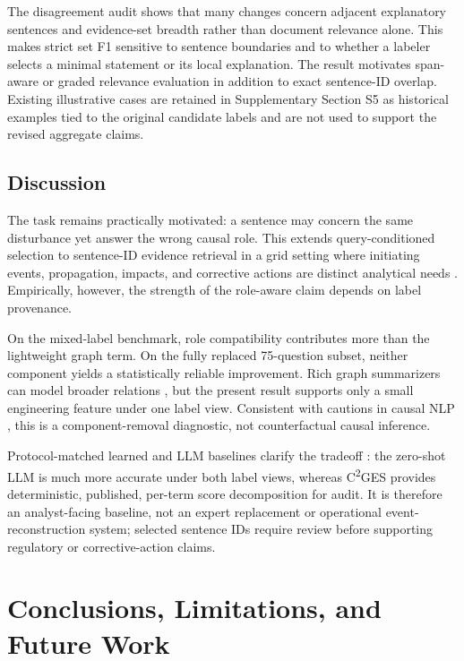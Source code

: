 \documentclass{article}
\begin{document}
The disagreement audit shows that many changes concern adjacent explanatory sentences and evidence-set breadth rather than document relevance alone. This makes strict set F1 sensitive to sentence boundaries and to whether a labeler selects a minimal statement or its local explanation. The result motivates span-aware or graded relevance evaluation in addition to exact sentence-ID overlap. Existing illustrative cases are retained in Supplementary Section S5 as historical examples tied to the original candidate labels and are not used to support the revised aggregate claims.

\subsection{Discussion}
\label{sec:discussion}

The task remains practically motivated: a sentence may concern the same disturbance yet answer the wrong causal role. This extends query-conditioned selection \cite{zhong2021qmsum,zhong2020extractive} to sentence-ID evidence retrieval \cite{liao2023muser,liang2020hammer} in a grid setting where initiating events, propagation, impacts, and corrective actions are distinct analytical needs \cite{rajkumar2023cyber,xie2022massively}. Empirically, however, the strength of the role-aware claim depends on label provenance.

On the mixed-label benchmark, role compatibility contributes more than the lightweight graph term. On the fully replaced 75-question subset, neither component yields a statistically reliable improvement. Rich graph summarizers can model broader relations \cite{wang2020heterogeneous,jing2021multiplex}, but the present result supports only a small engineering feature under one label view. Consistent with cautions in causal NLP \cite{feder2022causal}, this is a component-removal diagnostic, not counterfactual causal inference.

Protocol-matched learned and LLM baselines clarify the tradeoff \cite{qin2024pairwise,zhuang2024setwise,ren2025selfcalibrated}: the zero-shot LLM is much more accurate under both label views, whereas C\textsuperscript{2}GES provides deterministic, published, per-term score decomposition for audit. It is therefore an analyst-facing baseline, not an expert replacement or operational event-reconstruction system; selected sentence IDs require review before supporting regulatory or corrective-action claims.

\section{Conclusions, Limitations, and Future Work}
\label{sec:conclusion}
\end{document}
